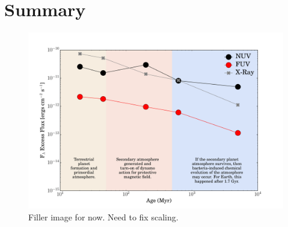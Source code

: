 \documentclass[twocolumn]{aastex62}
\begin{document}
\section{Summary}

\begin{figure}[t]
\centering
\includegraphics[width=0.8\linewidth]{planet_timeline_xray.pdf}
\caption{Filler image for now. Need to fix scaling. \label{fig:planet_timeline}}
\end{figure}


\end{document}
